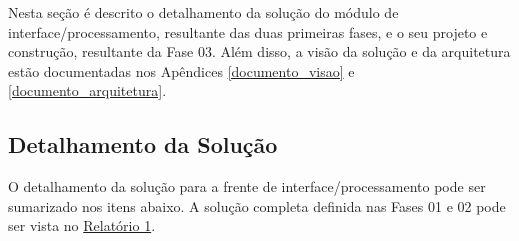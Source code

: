\label{desenvolvimento_processamento}

Nesta seção é descrito o detalhamento da solução do módulo de interface/processamento, resultante das duas primeiras fases, 
e o seu projeto e construção, resultante da Fase 03. Além disso, a visão da solução e da arquitetura estão
documentadas nos Apêndices \ref{documento_visao} e \ref{documento_arquitetura}.

\subsection{Detalhamento da Solução} \label{software:detalhamento_solucao}

O detalhamento da solução para a frente de interface/processamento pode ser sumarizado nos itens abaixo. A solução completa definida nas 
  Fases 01 e 02 pode ser vista no \href{https://drive.google.com/file/d/0B5InkGKx6O-MR1B3eVYzZFpjQ3c/view?usp=sharing}{Relatório 1}.





